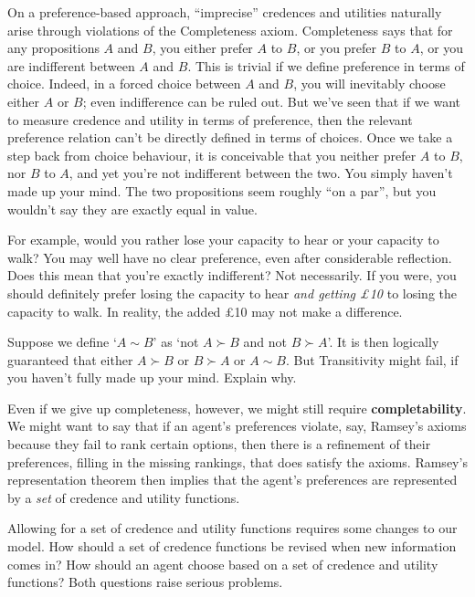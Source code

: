 On a preference-based approach, ``imprecise'' credences and utilities naturally
arise through violations of the Completeness axiom. Completeness says that for
any propositions $A$ and $B$, you either prefer $A$ to $B$, or you prefer $B$ to
$A$, or you are indifferent between $A$ and $B$. This is trivial if we define
preference in terms of choice. Indeed, in a forced choice between $A$ and $B$,
you will inevitably choose either $A$ or $B$; even indifference can be ruled
out. But we've seen that if we want to measure credence and utility in terms of
preference, then the relevant preference relation can't be directly defined in
terms of choices. Once we take a step back from choice behaviour, it is
conceivable that you neither prefer $A$ to $B$, nor $B$ to $A$, and yet you're
not indifferent between the two. You simply haven't made up your mind. The two
propositions seem roughly ``on a par'', but you wouldn't say they are exactly
equal in value.


For example, would you rather lose your capacity to hear or your capacity to
walk? You may well have no clear preference, even after considerable reflection.
Does this mean that you're exactly indifferent? Not necessarily. If you were,
you should definitely prefer losing the capacity to hear \emph{and getting £10}
to losing the capacity to walk. In reality, the added £10 may not make a
difference. 

\begin{exercise}{2}
  Suppose we define `$A\sim B$' as `not $A \succ B$ and not $B \succ A$'. It is
  then logically guaranteed that either $A \succ B$ or $B\succ A$ or $A \sim B$.
  But Transitivity might fail, if you haven't fully made up your mind. Explain
  why.
\end{exercise}

Even if we give up completeness, however, we might still require
\textbf{completability}. We might want to say that if an agent's preferences
violate, say, Ramsey's axioms because they fail to rank certain options, then
there is a refinement of their preferences, filling in the missing rankings,
that does satisfy the axioms. Ramsey's representation theorem then implies that
the agent's preferences are represented by a \emph{set} of credence and utility
functions.

Allowing for a set of credence and utility functions requires some changes to our
model. How should a set of credence functions be revised when new information
comes in? How should an agent choose based on a set of credence and utility
functions? Both questions raise serious problems.

